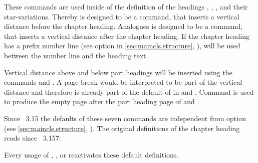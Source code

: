 \begin{Declaration}
\end{Declaration}
These commands are used inside of the definition of the headings
, , ,
 and their star-variations. Thereby
 is designed to be a command, that inserts a
vertical distance before the chapter heading. Analogues
 is designed to be a command, that inserts a vertical
distance after the chapter heading. If the chapter heading has a prefix number line (see option
 in \autoref{sec:maincls.structure},
), 
will be used between the number line and the heading text.

Vertical distance above and below part headings will be inserted using the
commands  and . A page break
would be interpreted to be part of the vertical distance and therefore is
already part of the default of  in
 and
. Command
 is used to produce the empty page after the part heading
page of  and .

Since \KOMAScript~3.15 the defaults of these seven commands
are independent from option  (see
\autoref{sec:maincls.structure},
). The original definitions of the
chapter heading reads since
\KOMAScript~3.157:
\begin{lstcode}
  \newcommand*{\chapterheadstartvskip}{\vspace{\@tempskipa}}
  \newcommand*{\chapterheadmidvskip}{\par\nobreak\vskip\@tempskipa}
  \newcommand*{\chapterheadendvskip}{\vskip\@tempskipa}
\end{lstcode}
Every usage of ,
, or
 reactivates these default
definitions.

